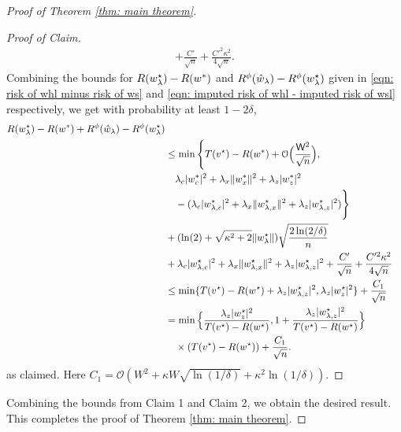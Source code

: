 \begin{proof}[Proof of Theorem \ref{thm: main theorem}]
\begin{proof}[Proof of Claim]
\begin{equation}
\begin{aligned}
                +  \frac{C'}{\sqrt{n}} +
                \frac{C'^2\kappa^2}{4\sqrt{n}}.
            \end{aligned}
        \end{equation}
Combining the bounds for $R(w^\star_{\lambda})-R(w^*)$ and $R^\phi(\hat{w}_\lambda)-R^\phi(w^\star_{\lambda})$ given in \eqref{eqn: risk of whl minus risk of ws} and \eqref{eqn: imputed risk of whl - imputed risk of wsl} respectively, we get with probability at least $1-2\delta$,
        \begin{equation*}
            \begin{aligned}
                R(w^\star_{\lambda})-R(w^*) + R^\phi(\hat{w}_\lambda) - R^\phi(w^\star_{\lambda}) \\
                &\leq \min\Bigg\{T(v^\star)-R(w^*) + \mathcal{O}\Big(\frac{\mathsf{W}^2}{\sqrt{n}}\Big), \\
                &\quad \lambda_c|w^*_{c}|^2 + \lambda_x\|w^*_{x}\|^2 + \lambda_z|w^*_{z}|^2 \\
                &\quad -(\lambda_c|w^\star_{{\lambda,c}}|^2 + \lambda_x\|w^\star_{{\lambda,x}}\|^2 + \lambda_z|w^\star_{{\lambda,z}}|^2)\Bigg\} \\
                    &+ (\ln(2) + \sqrt{\kappa^2+2}\|w^\star_{\lambda}\|)\sqrt{\frac{2\ln(2/\delta)}{n}} \\
                &+\lambda_c|w^\star_{{\lambda,c}}|^2 +
                \lambda_x\|w^\star_{{\lambda,x}}\|^2 + \lambda_z|w^\star_{{\lambda,z}}|^2
                +  \frac{C'}{\sqrt{n}} +
                \frac{C'^2\kappa^2}{4\sqrt{n}}\\
                &\leq  \min\{T(v^\star) - R(w^\star) + \lambda_z|w^\star_{{\lambda,z}}|^2,\lambda_z|w^\star_z|^2\} + \frac{C_1}{\sqrt{n}}\\
                &=\min\Big\{\frac{\lambda_z|w^\star_z|^2}{T(v^\star)-R(w^\star)},1+\frac{\lambda_z|w^\star_{{\lambda,z}}|^2}{T(v^\star)-R(w^\star)}\Big\} \\
                &\quad \times (T(v^\star)-R(w^\star)) + \frac{C_1}{\sqrt{n}}.
                \end{aligned}
        \end{equation*}
        as claimed. Here $C_1 = \mathcal{O}\left( W^2 + \kappa W \sqrt{\ln(1/\delta)} + \kappa^2 \ln(1/\delta) \right)$.
    \end{proof}

    Combining the bounds from Claim 1 and Claim 2, we obtain the desired result.
    This completes the proof of Theorem \ref{thm: main theorem}.
\end{proof}